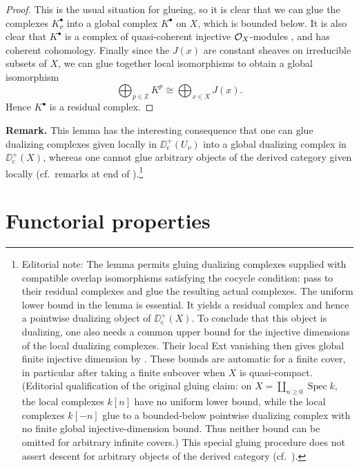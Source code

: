 \begin{proof}
This is the usual situation for glueing, so it is clear that we can glue the complexes $K_{\nu}^{\bullet}$ into a global complex $K^{\bullet}$ on $X$, which is bounded below. It is also clear that $K^{\bullet}$ is a complex of quasi-coherent injective $\mathcal{O}_X$-modules , and has coherent cohomology. Finally since the $J(x)$ are constant sheaves on irreducible subsets of $X$, we can glue together local isomorphisms to obtain a global isomorphism
\[
\bigoplus_{p\in\mathbb{Z}} K^{p} \cong \bigoplus_{x\in X} J(x).
\]
Hence $K^\bullet$ is a residual complex.
\end{proof}

\par\medskip\noindent\textbf{Remark.}
This lemma has the interesting consequence that one can glue dualizing complexes given locally in $\DD_{\mathrm{c}}^{+}(U_{\nu})$ into a global dualizing complex in $\DD_{\mathrm{c}}^{+}(X)$, whereas one cannot glue arbitrary objects of the derived category given locally (cf.\ remarks at end of ).\footnote{Editorial note: The lemma permits gluing dualizing complexes supplied with compatible overlap isomorphisms satisfying the cocycle condition: pass to their residual complexes and glue the resulting actual complexes. The uniform lower bound in the lemma is essential. It yields a residual complex and hence a pointwise dualizing object of $\DD_{\mathrm{c}}^+(X)$. To conclude that this object is dualizing, one also needs a common upper bound for the injective dimensions of the local dualizing complexes. Their local Ext vanishing then gives global finite injective dimension by . These bounds are automatic for a finite cover, in particular after taking a finite subcover when $X$ is quasi-compact. (Editorial qualification of the original gluing claim: on $X=\coprod_{n\geq0}\operatorname{Spec}k$, the local complexes $k[n]$ have no uniform lower bound, while the local complexes $k[-n]$ glue to a bounded-below pointwise dualizing complex with no finite global injective-dimension bound. Thus neither bound can be omitted for arbitrary infinite covers.) This special gluing procedure does not assert descent for arbitrary objects of the derived category (cf.\ ).}
\par\medskip

\par\endgroup

\section{Functorial properties}\label{sec:6.2}
\begingroup
\setlength{\emergencystretch}{2em}

